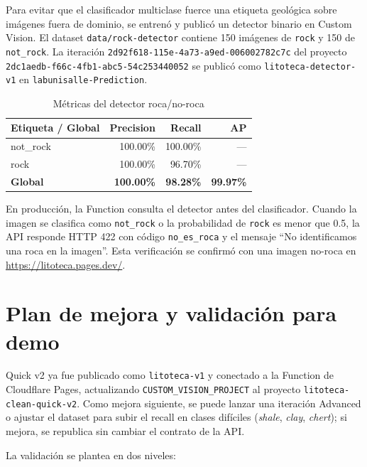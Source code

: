 Para evitar que el clasificador multiclase fuerce una etiqueta geológica sobre
imágenes fuera de dominio, se entrenó y publicó un detector binario en Custom
Vision. El dataset \texttt{data/rock-detector} contiene 150 imágenes de
\texttt{rock} y 150 de \texttt{not\_rock}. La iteración
\texttt{2d92f618-115e-4a73-a9ed-006002782c7c} del proyecto
\texttt{2dc1aedb-f66c-4fb1-abc5-54c253440052} se publicó como
\texttt{litoteca-detector-v1} en \texttt{labunisalle-Prediction}.

\begin{table}[H]
  \centering
  \caption{Métricas del detector roca/no-roca}
  \label{tab:detector-metricas}
  \begin{tabular}{@{}lrrr@{}}
    \toprule
    Etiqueta / Global & Precision & Recall & AP \\
    \midrule
    not\_rock & 100.00\% & 100.00\% & --- \\
    rock & 100.00\% & 96.70\% & --- \\
    \midrule
    \textbf{Global} & \textbf{100.00\%} & \textbf{98.28\%} & \textbf{99.97\%} \\
    \bottomrule
  \end{tabular}
\end{table}

En producción, la Function consulta el detector antes del clasificador. Cuando la
imagen se clasifica como \texttt{not\_rock} o la probabilidad de \texttt{rock}
es menor que 0.5, la API responde HTTP 422 con código \texttt{no\_es\_roca} y el
mensaje ``No identificamos una roca en la imagen''. Esta verificación se confirmó
con una imagen no-roca en \url{https://litoteca.pages.dev/}.

\section{Plan de mejora y validación para demo}

Quick v2 ya fue publicado como \texttt{litoteca-v1} y conectado a la Function de
Cloudflare Pages, actualizando \texttt{CUSTOM\_VISION\_PROJECT} al proyecto
\texttt{litoteca-clean-quick-v2}. Como mejora siguiente, se puede lanzar una
iteración Advanced o ajustar el dataset para subir el recall en clases difíciles
(\emph{shale}, \emph{clay}, \emph{chert}); si mejora, se republica sin cambiar el
contrato de la API.

La validación se plantea en dos niveles:

